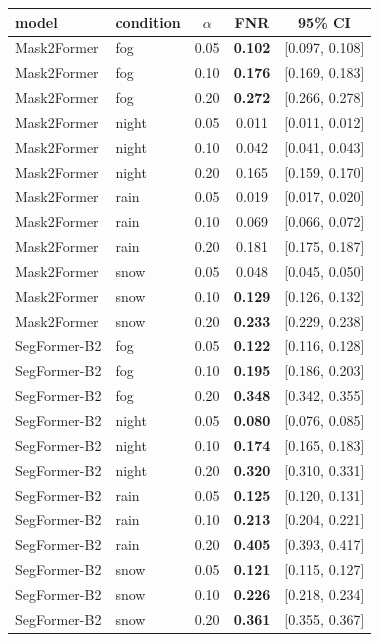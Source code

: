 \begin{table}[t]
\centering
\footnotesize
\setlength{\tabcolsep}{3pt}
\begin{tabular}{llccc}
\toprule
model & condition & $\alpha$ & FNR & 95\% CI \\
\midrule
Mask2Former & fog & 0.05 & \textbf{0.102} & [0.097, 0.108] \\
Mask2Former & fog & 0.10 & \textbf{0.176} & [0.169, 0.183] \\
Mask2Former & fog & 0.20 & \textbf{0.272} & [0.266, 0.278] \\
Mask2Former & night & 0.05 & 0.011 & [0.011, 0.012] \\
Mask2Former & night & 0.10 & 0.042 & [0.041, 0.043] \\
Mask2Former & night & 0.20 & 0.165 & [0.159, 0.170] \\
Mask2Former & rain & 0.05 & 0.019 & [0.017, 0.020] \\
Mask2Former & rain & 0.10 & 0.069 & [0.066, 0.072] \\
Mask2Former & rain & 0.20 & 0.181 & [0.175, 0.187] \\
Mask2Former & snow & 0.05 & 0.048 & [0.045, 0.050] \\
Mask2Former & snow & 0.10 & \textbf{0.129} & [0.126, 0.132] \\
Mask2Former & snow & 0.20 & \textbf{0.233} & [0.229, 0.238] \\
SegFormer-B2 & fog & 0.05 & \textbf{0.122} & [0.116, 0.128] \\
SegFormer-B2 & fog & 0.10 & \textbf{0.195} & [0.186, 0.203] \\
SegFormer-B2 & fog & 0.20 & \textbf{0.348} & [0.342, 0.355] \\
SegFormer-B2 & night & 0.05 & \textbf{0.080} & [0.076, 0.085] \\
SegFormer-B2 & night & 0.10 & \textbf{0.174} & [0.165, 0.183] \\
SegFormer-B2 & night & 0.20 & \textbf{0.320} & [0.310, 0.331] \\
SegFormer-B2 & rain & 0.05 & \textbf{0.125} & [0.120, 0.131] \\
SegFormer-B2 & rain & 0.10 & \textbf{0.213} & [0.204, 0.221] \\
SegFormer-B2 & rain & 0.20 & \textbf{0.405} & [0.393, 0.417] \\
SegFormer-B2 & snow & 0.05 & \textbf{0.121} & [0.115, 0.127] \\
SegFormer-B2 & snow & 0.10 & \textbf{0.226} & [0.218, 0.234] \\
SegFormer-B2 & snow & 0.20 & \textbf{0.361} & [0.355, 0.367] \\

\end{tabular}
\end{table}
